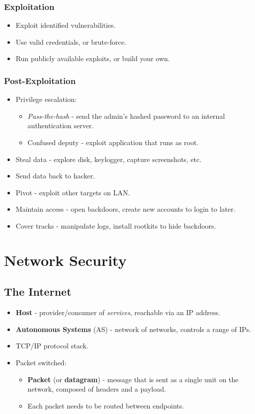 \documentclass[11pt]{article}
\begin{document}
\subsubsection{Exploitation}
\begin{itemize}
  \item Exploit identified vulnerabilities.
  \item Use valid credentials, or brute-force.
  \item Run publicly available exploits, or build your own.
\end{itemize}

\subsubsection{Post-Exploitation}
\begin{itemize}
  \item Privilege escalation:
    \begin{itemize}
      \item \textit{Pass-the-hash} - send the admin's hashed password to an internal authentication server.
      \item Confused deputy - exploit application that runs as root.
    \end{itemize}
  \item Steal data - explore disk, keylogger, capture screenshots, etc.
  \item Send data back to hacker.
  \item Pivot - exploit other targets on LAN.
  \item Maintain access - open backdoors, create new accounts to login to later.
  \item Cover tracks - manipulate logs, install rootkits to hide backdoors.
\end{itemize}

\section{Network Security}
\subsection{The Internet}
\begin{itemize}
  \item \textbf{Host} - provider/consumer of \textit{services}, reachable via an IP address.
  \item \textbf{Autonomous Systems} (AS) - network of networks, controls a range of IPs.
  \item TCP/IP protocol stack.
  \item Packet switched:
    \begin{itemize}
      \item \textbf{Packet} (or \textbf{datagram}) - message that is sent as a single unit on the network, composed of headers and a payload.
      \item Each packet needs to be routed between endpoints.
    \end{itemize}
\end{itemize}
\end{document}
